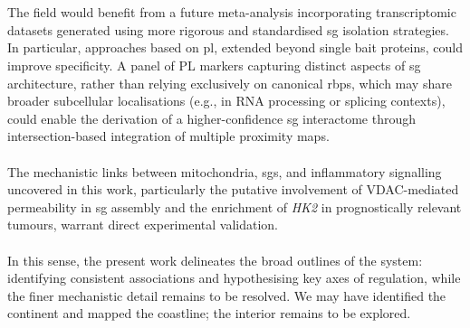 \\
\\
The field would benefit from a future meta-analysis incorporating transcriptomic datasets generated using more rigorous and standardised \gls{sg} isolation strategies. In particular, approaches based on \gls{pl}, extended beyond single bait proteins, could improve specificity. A panel of PL markers capturing distinct aspects of \gls{sg} architecture, rather than relying exclusively on canonical \gls{rbp}s, which may share broader subcellular localisations (e.g., in RNA processing or splicing contexts), could enable the derivation of a higher-confidence \gls{sg} interactome through intersection-based integration of multiple proximity maps.
\\
\\
The mechanistic links between mitochondria, \gls{sg}s, and inflammatory signalling uncovered in this work, particularly the putative involvement of VDAC-mediated permeability in \gls{sg} assembly and the enrichment of \textit{HK2} in prognostically relevant tumours, warrant direct experimental validation.
\\
\\
In this sense, the present work delineates the broad outlines of the system: identifying consistent associations and hypothesising key axes of regulation, while the finer mechanistic detail remains to be resolved. We may have identified the continent and mapped the coastline; the interior remains to be explored.
